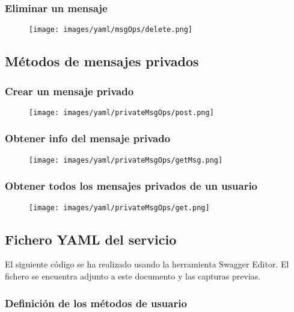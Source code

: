 \documentclass[12pt,a4paper, spanish]{article}
\begin{document}
\subsubsection{Eliminar un mensaje}
\begin{figure}[H]
	\centering
	\texttt{[image: images/yaml/msgOps/delete.png]}
\end{figure}

\newpage
\subsection{Métodos de mensajes privados}
\subsubsection{Crear un mensaje privado}
\begin{figure}[H]
	\centering
	\texttt{[image: images/yaml/privateMsgOps/post.png]}
\end{figure}
\subsubsection{Obtener info del mensaje privado}
\begin{figure}[H]
	\centering
	\texttt{[image: images/yaml/privateMsgOps/getMsg.png]}
\end{figure}
\subsubsection{Obtener todos los mensajes privados de un usuario}
\begin{figure}[H]
	\centering
	\texttt{[image: images/yaml/privateMsgOps/get.png]}
\end{figure}

\newpage
\subsection{Fichero YAML del servicio}
El siguiente código se ha realizado usando la herramienta Swagger Editor. El fichero se encuentra adjunto a este documento y las capturas previas. 


\newpage
\subsubsection{Definición de los métodos de usuario}

\end{document}
